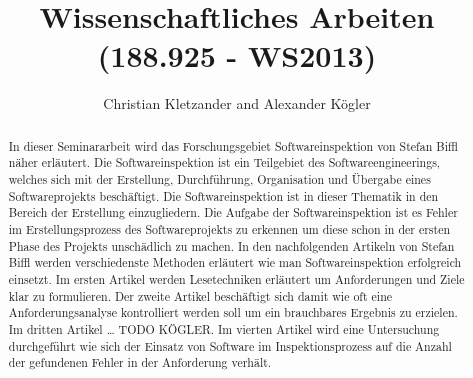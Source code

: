 \documentclass{llncs}
\begin{document}
\pagestyle{plain}

\title{Wissenschaftliches Arbeiten (188.925 - WS2013)}


\author{Christian Kletzander and Alexander Kögler}


\maketitle

\begin{abstract}
In dieser Seminararbeit wird das Forschungsgebiet Softwareinspektion von Stefan Biffl näher erläutert. Die Softwareinspektion ist ein Teilgebiet des Softwareengineerings, welches sich mit der Erstellung, Durchführung, Organisation und Übergabe eines Softwareprojekts beschäftigt. Die Softwareinspektion ist in dieser Thematik in den Bereich der Erstellung einzugliedern. Die Aufgabe der Softwareinspektion ist es Fehler im Erstellungsprozess des Softwareprojekts zu erkennen um diese schon in der ersten Phase des Projekts unschädlich zu machen. In den nachfolgenden Artikeln von Stefan Biffl werden verschiedenste Methoden erläutert wie man Softwareinspektion erfolgreich einsetzt. Im ersten Artikel werden Lesetechniken erläutert um Anforderungen und Ziele klar zu formulieren. Der zweite Artikel beschäftigt sich damit wie oft eine Anforderungsanalyse kontrolliert werden soll um ein brauchbares Ergebnis zu erzielen. Im dritten Artikel … TODO KÖGLER. Im vierten Artikel wird eine Untersuchung durchgeführt wie sich der Einsatz von Software im Inspektionsprozess auf die Anzahl der gefundenen Fehler in der Anforderung verhält.
\end{abstract}

\tableofcontents
\newpage
\end{document}
